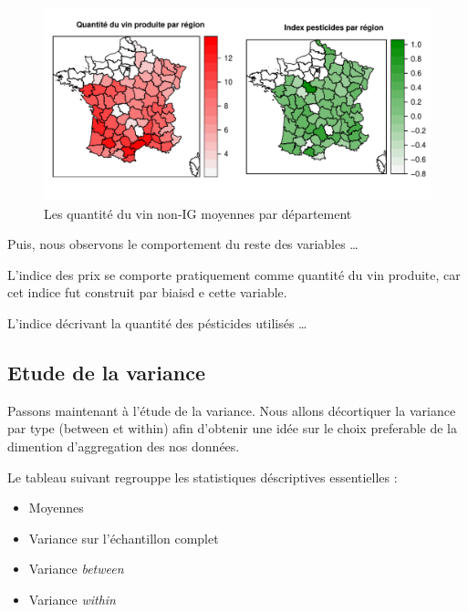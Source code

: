 \documentclass[11pt,]{article}
\providecommand{\tightlist}{%
  \setlength{\itemsep}{0pt}\setlength{\parskip}{0pt}}
\begin{document}
\begin{figure}[!htbp]

{\centering \includegraphics{note2pres_files/figure-latex/unnamed-chunk-16-1} 

}

\caption{Les quantité du vin non-IG moyennes par département}\label{fig:unnamed-chunk-16}
\end{figure}

\FloatBarrier

Puis, nous observons le comportement du reste des variables \ldots{}

L'indice des prix se comporte pratiquement comme quantité du vin
produite, car cet indice fut construit par biaisd e cette variable.

L'indice décrivant la quantité des pésticides utilisés \ldots{}

\hypertarget{etude-de-la-variance}{%
\subsection{Etude de la variance}\label{etude-de-la-variance}}

Passons maintenant à l'étude de la variance. Nous allons décortiquer la
variance par type (between et within) afin d'obtenir une idée sur le
choix preferable de la dimention d'aggregation des nos données.

Le tableau suivant regrouppe les statistiques déscriptives essentielles
:

\begin{itemize}
\tightlist
\item
  Moyennes
\item
  Variance sur l'échantillon complet
\item
  Variance \emph{between}
\item
  Variance \emph{within}
\end{itemize}
\end{document}
